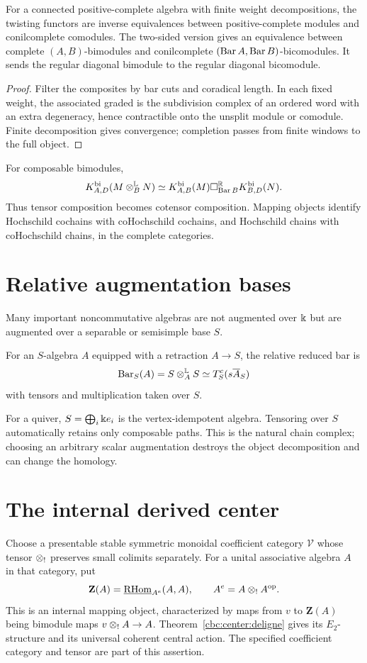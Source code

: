 \begin{theorem}\label{thm:module-comodule}
For a connected positive-complete algebra with finite weight decompositions, the twisting functors are inverse equivalences between positive-complete modules and conilcomplete comodules.  The two-sided version gives an equivalence between complete \((A,B)\)-bimodules and conilcomplete \((\operatorname{Bar} A,\operatorname{Bar} B)\)-bicomodules.  It sends the regular diagonal bimodule to the regular diagonal bicomodule.
\end{theorem}
\begin{proof}
Filter the composites by bar cuts and coradical length.  In each fixed weight, the associated graded is the subdivision complex of an ordered word with an extra degeneracy, hence contractible onto the unsplit module or comodule.  Finite decomposition gives convergence; completion passes from finite windows to the full object.
\end{proof}

For composable bimodules,
\[
 K_{A,D}^{\mathrm{bi}}(M\otimes_B^{\mathbb L}N)
 \simeq
 K_{A,B}^{\mathrm{bi}}(M)\square^{\mathbb R}_{\operatorname{Bar} B}
 K_{B,D}^{\mathrm{bi}}(N).
\]
Thus tensor composition becomes cotensor composition.  Mapping objects identify Hochschild cochains with coHochschild cochains, and Hochschild chains with coHochschild chains, in the complete categories.

\section{Relative augmentation bases}
Many important noncommutative algebras are not augmented over \(\Bbbk\) but are augmented over a separable or semisimple base \(S\).

\begin{definition}
For an \(S\)-algebra \(A\) equipped with a retraction \(A\to S\), the relative reduced bar is
\[
 \operatorname{Bar}_S(A)=S\otimes_A^{\mathbb L}S
 \simeq T_S^c(s\overline{A}_S)
\]
with tensors and multiplication taken over \(S\).
\end{definition}

For a quiver, \(S=\bigoplus_i\Bbbk e_i\) is the vertex-idempotent algebra.  Tensoring over \(S\) automatically retains only composable paths.  This is the natural chain complex; choosing an arbitrary scalar augmentation destroys the object decomposition and can change the homology.

\section{The internal derived center}
Choose a presentable stable symmetric monoidal coefficient category $\mathcal V$ whose tensor $\mathbin{\otimes_{!}}$ preserves small colimits separately.
For a unital associative algebra $A$ in that category, put
\[
 \mathbf Z(A)=\underline{\operatorname{RHom}}_{A^e}(A,A),
 \qquad A^e=A\mathbin{\otimes_{!}} A^{\mathrm{op}}.
\]
This is an internal mapping object, characterized by maps from $v$ to $\mathbf Z(A)$ being bimodule maps $v\mathbin{\otimes_{!}} A\to A$.
Theorem~\ref{cbc:center:deligne} gives its $E_2$-structure and its universal coherent central action.
The specified coefficient category and tensor are part of this assertion.

